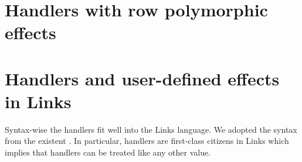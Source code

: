 \section{Handlers with row polymorphic effects}\label{sec:eval-abs}

\section{Handlers and user-defined effects in Links}
Syntax-wise the handlers fit well into the Links language. We adopted the syntax from the existent . In particular, handlers are first-class citizens in Links which implies that handlers can be treated like any other value.